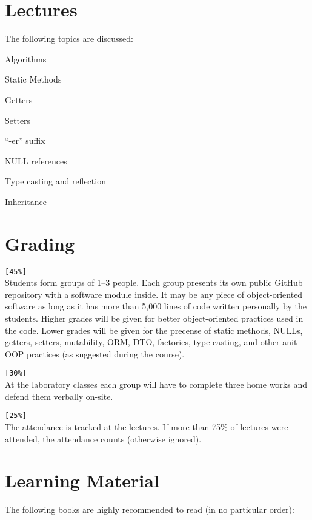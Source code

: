 \documentclass[nobrand,anonymous,nodate,nosecurity]{huawei}
\begin{document}
{\newpage
\section*{Lectures}

The following topics are discussed:

\begin{lectures}
\item Algorithms
\item Static Methods
\item Getters
\item Setters
\item ``-er'' suffix
\item NULL references
\item Type casting and reflection
\item Inheritance
\end{lectures}

\newpage
\section*{Grading}

\texttt{[45\%]} \\
Students form groups of 1--3 people. Each group presents
its own public GitHub repository with a software module inside.
It may be any piece of object-oriented software as long as it has more than 5,000 lines
of code written personally by the students.
Higher grades will be given
for better object-oriented practices used in the code. Lower grades will be
given for the precense of static methods, NULLs, getters, setters, mutability,
ORM, DTO, factories, type casting, and other anit-OOP practices (as suggested during the course).

\texttt{[30\%]} \\
At the laboratory classes each group will have to complete three
home works and defend them verbally on-site.

\texttt{[25\%]} \\
The attendance is tracked at the lectures. If more than 75\% of lectures were attended,
the attendance counts (otherwise ignored).

\newpage
\section*{Learning Material}

The following books are highly recommended to read (in no particular order):

}
\end{document}
